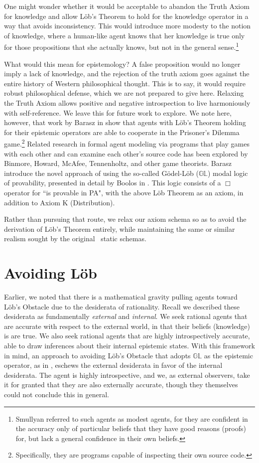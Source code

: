 One might wonder whether it would be acceptable to abandon the Truth Axiom for knowledge and allow L\"ob's Theorem to hold for the knowledge operator in a way that avoids inconsistency. This would introduce more modesty to the notion of knowledge, where a human-like agent knows that her knowledge is true only for those propositions that she actually knows, but not in the general sense.\footnote{Smullyan referred to such agents as modest agents, for they are confident in the accuracy only of particular beliefs that they have good reasons (proofs) for, but lack a general confidence in their own beliefs.} 

What would this mean for epistemology? A false proposition would no longer imply a lack of knowledge, and the rejection of the truth axiom goes against the entire history of Western philosophical thought. This is to say, it would require robust philosophical defense, which we are not prepared to give here. Relaxing the Truth Axiom allows positive and negative introspection to live harmoniously with self-reference. We leave this for future work to explore. We note here, however, that work by Barasz \etal in \cite{modal_prisoner} show that agents with L\"ob's Theorem holding for their epistemic operators are able to cooperate in the Prisoner's Dilemma game.\footnote{Specifically, they are programs capable of inspecting their own source code.} Related research in formal agent modeling via programs that play games with each other and can examine each other's source code has been explored by Binmore, Howard, McAfee, Tennenholtz, and other game theorists. Barasz \etal introduce the novel approach of using the so-called G\"odel-L\"ob ($\mathbb{GL}$) modal logic of provability, presented in detail by Boolos in \cite{Boolos}. This logic consists of a $\Box$ operator for ``is provable in PA", with the above L\"ob Theorem as an axiom, in addition to Axiom K (Distribution).

Rather than pursuing that route, we relax our axiom schema so as to avoid the derivation of L\"ob's Theorem entirely, while maintaining the same or similar realism sought by the original \DASL\ static schemas.

\section{Avoiding L\"ob}
\label{sec:avoiding_lob}
Earlier, we noted that there is a mathematical gravity pulling agents toward L\"ob's Obstacle due to the desiderata of rationality. Recall we described these desiderata as fundamentally \emph{external} and \emph{internal}. We seek rational agents that are accurate with respect to the external world, in that their beliefs (knowledge) is are true. We also seek rational agents that are highly introspectively accurate, able to draw inferences about their internal epistemic states. With this framework in mind, an approach to avoiding L\"ob's Obstacle that adopts $\mathbb{GL}$ as the epistemic operator, as in \cite{modal_prisoner}, eschews the external desiderata in favor of the internal desiderata. The agent is highly introspective, and we, as external observers, take it for granted that they are also externally accurate, though they themselves could not conclude this in general.

